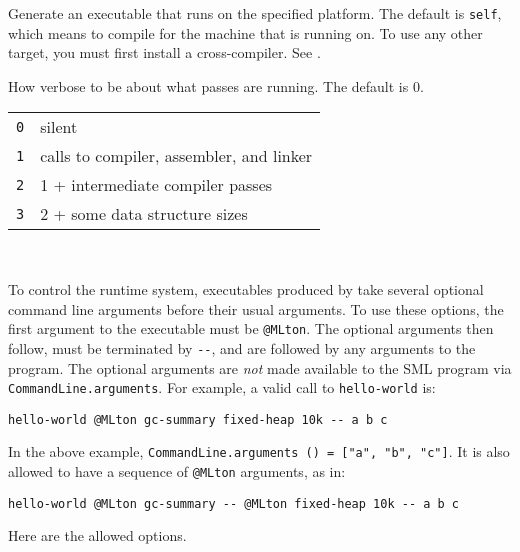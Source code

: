 \begin{description}
Generate an executable that runs on the specified platform.  The default
is {\tt self}, which means to compile for the machine that {\mlton} is
running on.  To use any other target, you must first install a
cross-compiler.  See .

How verbose to be about what passes are running.  The default is 0.\\
\hspace*{0.5in}
\begin{tabular}{l|l}
\hline
{\tt 0} & silent\\
{\tt 1} & calls to compiler, assembler, and linker\\
{\tt 2} & 1 + intermediate compiler passes\\
{\tt 3} & 2 + some data structure sizes\\
\end{tabular}\\

\end{description}


To control the runtime system, executables produced by {\mlton} take
several optional command line arguments before their usual arguments.
To use these options, the first argument to the executable must be
\verb+@MLton+.  The optional arguments then follow, must be
terminated by \verb+--+, and are followed by any arguments to the
program.  The optional arguments are {\em not} made available to the
SML program via {\tt CommandLine.arguments}.  For example, a valid
call to {\tt hello-world} is:
\begin{verbatim}
hello-world @MLton gc-summary fixed-heap 10k -- a b c
\end{verbatim}
In the above example, {\tt CommandLine.arguments () = ["a", "b",
"c"]}.  It is also allowed to have a sequence of \verb+@MLton+
arguments, as in:
\begin{verbatim}
hello-world @MLton gc-summary -- @MLton fixed-heap 10k -- a b c
\end{verbatim}

Here are the allowed options.

